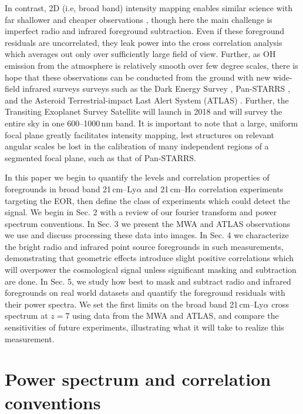 \documentclass{emulateapj}
\begin{document}
In contrast, 2D (i.e, broad band) intensity mapping enables similar science with far shallower and cheaper observations \citep{StarsAndReionization,mao14}, though here the main challenge is imperfect radio and infrared foreground subtraction. Even if these foreground residuals are uncorrelated, they leak power into the cross correlation analysis which averages out only over sufficiently large field of view. Further, as OH emission from the atmosphere is relatively smooth over few degree scales, there is hope that these observations can be conducted from the ground with new wide-field infrared surveys surveys such as the Dark Energy Survey \citep{des16}, Pan-STARRS \citep{tonry12}, and the Asteroid Terrestrial-impact Last Alert System (ATLAS) \citep{tonry11}. Further, the Transiting Exoplanet Survey Satellite \citep{ricker14} will launch in 2018 and will survey the entire sky in one 600--1000\,nm band. It is important to note that a large, uniform focal plane greatly facilitates intensity mapping, lest structures on relevant angular scales be lost in the calibration of many independent regions of a segmented focal plane, such as that of Pan-STARRS.

In this paper we begin to quantify the levels and correlation properties of foregrounds in broad band 21\,cm--Ly$\alpha$ and 21\,cm--H$\alpha$ correlation experiments targeting the EOR, then define the class of experiments which could detect the signal. We begin in Sec. 2 with a review of our fourier transform and power spectrum conventions.
  In Sec. 3 we present the MWA and ATLAS observations we use and discuss processing these data into images. 
   In Sec. 4 we characterize the bright radio and infrared point source foregrounds in such measurements, 
   demonstrating that geometric effects introduce slight positive correlations which will overpower the cosmological signal
   unless significant masking and subtraction are done. 
   In Sec. 5, we study how best to mask and subtract radio and infrared foregrounds on real world datasets and 
   quantify the foreground residuals with their power spectra. We set the first limits 
   on the broad band  21\,cm--Ly$\alpha$ cross spectrum at $z=7$ using data from the MWA
     and ATLAS, and compare the sensitivities of future experiments, 
     illustrating what it will take to realize this measurement.

\section{Power spectrum and correlation conventions}
\label{sec:pspecconventions}
\end{document}
